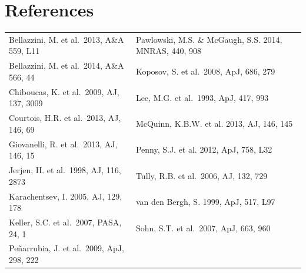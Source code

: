


\section*{References}

\begin{table}[h]
\begin{tabular}{ll}
Bellazzini, M. et al.\  2013, A\&A 559, L11 & Pawlowski, M.S. \&  McGaugh, S.S. 2014, MNRAS, 440, 908\\
Bellazzini, M. et al.\  2014, A\&A 566, 44 & Koposov, S. et al.\ 2008, ApJ, 686, 279\\
Chiboucas, K. et al.\  2009, AJ, 137, 3009 & Lee, M.G. et al.\ 1993, ApJ, 417, 993\\
Courtois, H.R. et al.\ 2013, AJ, 146, 69 &  McQuinn, K.B.W. et al. 2013, AJ, 146, 145\\
Giovanelli, R. et al.\ 2013, AJ, 146, 15 & Penny, S.J. et al. 2012, ApJ, 758, L32\\
Jerjen, H. et al.\ 1998, AJ, 116, 2873  &  Tully, R.B. et al.\ 2006, AJ, 132, 729\\
Karachentsev, I. 2005, AJ, 129, 178 &van den Bergh, S. 1999, ApJ, 517, L97\\
Keller, S.C. et al.\ 2007, PASA, 24, 1 & Sohn, S.T. et al.\ 2007, ApJ, 663, 960\\
{Pe{\~n}arrubia}, J. et al.\ 2009, ApJ, 298, 222\\
\end{tabular}
\end{table}




